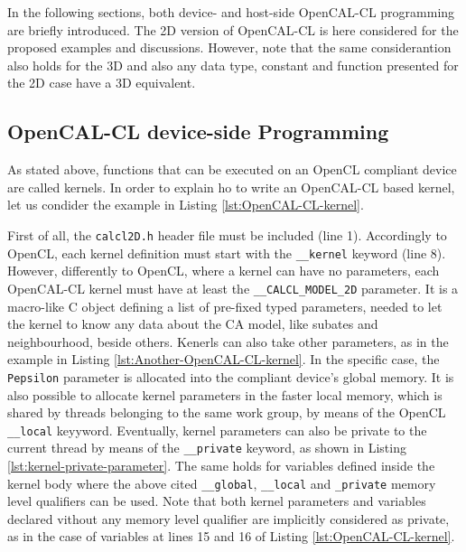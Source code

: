 In the following sections, both device- and host-side OpenCAL-CL
programming are briefly introduced. The 2D version of OpenCAL-CL is
here considered for the proposed examples and discussions. However,
note that the same considerantion also holds for the 3D and also any
data type, constant and function presented for the 2D case have a 3D
equivalent.


\subsection{OpenCAL-CL device-side Programming}

As stated above, functions that can be executed on an OpenCL compliant
device are called kernels. In order to explain ho to write an
OpenCAL-CL based kernel, let us condider the example in Listing
\ref{lst:OpenCAL-CL-kernel}.

First of all, the \verb'calcl2D.h' header file must be included (line
1). Accordingly to OpenCL, each kernel definition must start with the
\verb'__kernel' keyword (line 8). However, differently to OpenCL,
where a kernel can have no parameters, each OpenCAL-CL kernel must
have at least the \verb'__CALCL_MODEL_2D' parameter. It is a
macro-like C object defining a list of pre-fixed typed parameters,
needed to let the kernel to know any data about the CA model, like
subates and neighbourhood, beside others. Kenerls can also take other
parameters, as in the example in Listing
\ref{lst:Another-OpenCAL-CL-kernel}. In the specific case, the
\verb'Pepsilon' parameter is allocated into the compliant device's
global memory. It is also possible to allocate kernel parameters in
the faster local memory, which is shared by threads belonging to the
same work group, by means of the OpenCL \verb'__local'
keyyword. Eventually, kernel parameters can also be private to the
current thread by means of the \verb'__private' keyword, as shown in
Listing \ref{lst:kernel-private-parameter}. The same holds for
variables defined inside the kernel body where the above cited
\verb'__global', \verb'__local' and \verb'_private' memory level
qualifiers can be used. Note that both kernel parameters and variables
declared vithout any memory level qualifier are implicitly considered
as private, as in the case of variables at lines 15 and 16 of Listing
\ref{lst:OpenCAL-CL-kernel}.

